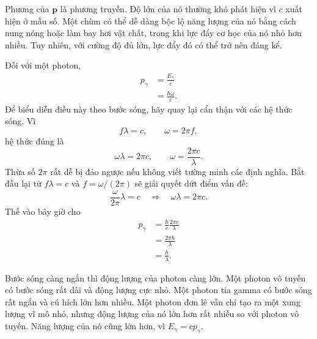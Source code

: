 Phương của \(\mathbf p\) là phương truyền. Độ lớn của nó thường khó phát hiện vì \(c\) xuất hiện ở mẫu số. Một chùm có thể dễ dàng bộc lộ năng lượng của nó bằng cách nung nóng hoặc làm bay hơi vật chất, trong khi lực đẩy cơ học của nó nhỏ hơn nhiều. Tuy nhiên, với cường độ đủ lớn, lực đẩy đó có thể trở nên đáng kể.

Đối với một photon,
\begin{align}
p_\gamma
&=\frac{E_\gamma}{c}\\
&=\frac{\hbar\omega}{c}.
\end{align}
Để biểu diễn điều này theo bước sóng, hãy quay lại cẩn thận với các hệ thức sóng. Vì
\begin{equation}
f\lambda=c,
\qquad
\omega=2\pi f,
\end{equation}
hệ thức đúng là
\begin{equation}
\omega\lambda=2\pi c,
\qquad
\omega=\frac{2\pi c}{\lambda}.
\end{equation}
Thừa số \(2\pi\) rất dễ bị đảo ngược nếu không viết tường minh các định nghĩa. Bắt đầu lại từ \(f\lambda=c\) và \(f=\omega/(2\pi)\) sẽ giải quyết dứt điểm vấn đề:
\begin{equation}
\frac{\omega}{2\pi}\lambda=c
\quad\Longrightarrow\quad
\omega\lambda=2\pi c.
\end{equation}
Thế vào bây giờ cho
\begin{align}
p_\gamma
&=\frac{\hbar}{c}\frac{2\pi c}{\lambda}\\
&=\frac{2\pi\hbar}{\lambda}\\
&=\frac{h}{\lambda}.
\end{align}

\begin{classroomqa}
\end{classroomqa}

Bước sóng càng ngắn thì động lượng của photon càng lớn. Một photon vô tuyến có bước sóng rất dài và động lượng cực nhỏ. Một photon tia gamma có bước sóng rất ngắn và cú hích lớn hơn nhiều. Một photon đơn lẻ vẫn chỉ tạo ra một xung lượng vĩ mô nhỏ, nhưng động lượng của nó lớn hơn rất nhiều so với photon vô tuyến. Năng lượng của nó cũng lớn hơn, vì \(E_\gamma=cp_\gamma\).

